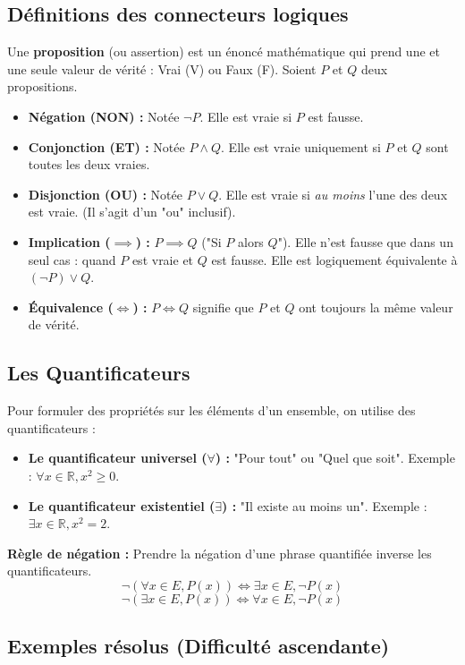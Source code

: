 \subsection{Définitions des connecteurs logiques}
Une \textbf{proposition} (ou assertion) est un énoncé mathématique qui prend une et une seule valeur de vérité : Vrai (V) ou Faux (F).
Soient $P$ et $Q$ deux propositions.

\begin{itemize}
    \item \textbf{Négation (NON) :} Notée $\neg P$. Elle est vraie si $P$ est fausse.
    \item \textbf{Conjonction (ET) :} Notée $P \land Q$. Elle est vraie uniquement si $P$ et $Q$ sont toutes les deux vraies.
    \item \textbf{Disjonction (OU) :} Notée $P \lor Q$. Elle est vraie si \textit{au moins} l'une des deux est vraie. (Il s'agit d'un "ou" inclusif).
    \item \textbf{Implication ($\implies$) :} $P \implies Q$ ("Si $P$ alors $Q$"). Elle n'est fausse que dans un seul cas : quand $P$ est vraie et $Q$ est fausse. Elle est logiquement équivalente à $(\neg P) \lor Q$.
    \item \textbf{Équivalence ($\iff$) :} $P \iff Q$ signifie que $P$ et $Q$ ont toujours la même valeur de vérité.
\end{itemize}



\subsection{Les Quantificateurs}
Pour formuler des propriétés sur les éléments d'un ensemble, on utilise des quantificateurs :
\begin{itemize}
    \item \textbf{Le quantificateur universel ($\forall$) :} "Pour tout" ou "Quel que soit". Exemple : $\forall x \in \mathbb{R}, x^2 \ge 0$.
    \item \textbf{Le quantificateur existentiel ($\exists$) :} "Il existe au moins un". Exemple : $\exists x \in \mathbb{R}, x^2 = 2$.
\end{itemize}

\textbf{Règle de négation :} Prendre la négation d'une phrase quantifiée inverse les quantificateurs.
$$ \neg (\forall x \in E, P(x)) \iff \exists x \in E, \neg P(x) $$
$$ \neg (\exists x \in E, P(x)) \iff \forall x \in E, \neg P(x) $$

\subsection{Exemples résolus (Difficulté ascendante)}

